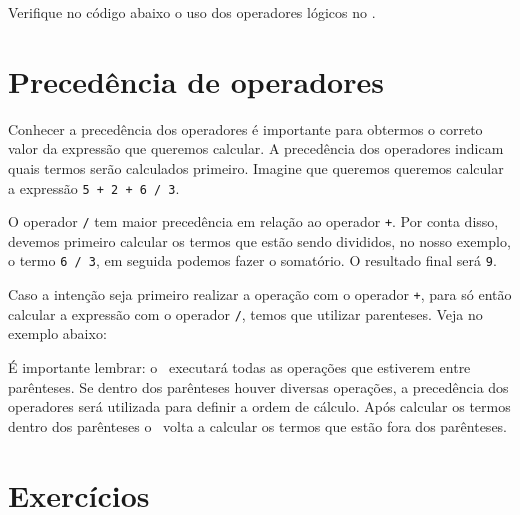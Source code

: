 

Verifique no código abaixo o uso dos operadores lógicos no \php.



\section{Precedência de operadores}
\label{precedencia-de-operadores}

Conhecer a precedência dos operadores é importante para obtermos o correto
valor da expressão que queremos calcular. A precedência dos operadores indicam quais
termos serão calculados primeiro. Imagine que queremos queremos calcular a
expressão \texttt{5 + 2 + 6 / 3}. 

O operador \texttt{/} tem maior precedência em relação ao operador \texttt{+}.
Por conta disso, devemos primeiro calcular os termos que estão sendo divididos, 
no nosso exemplo, o termo \texttt{6 / 3}, em seguida podemos fazer o somatório. 
O resultado final será \texttt{9}.

Caso a intenção seja primeiro realizar a operação com o operador \texttt{+}, para
só então calcular a expressão com o operador \texttt{/}, temos que utilizar
parenteses. Veja no exemplo abaixo:



É importante lembrar: o \php~executará todas as operações que estiverem
entre parênteses. Se dentro dos parênteses houver diversas operações, a precedência
dos operadores será utilizada para definir a ordem de cálculo. Após calcular
os termos dentro dos parênteses o \php~volta a calcular os termos que estão
fora dos parênteses.

\section{Exercícios}
\label{cap4-exercicios}

